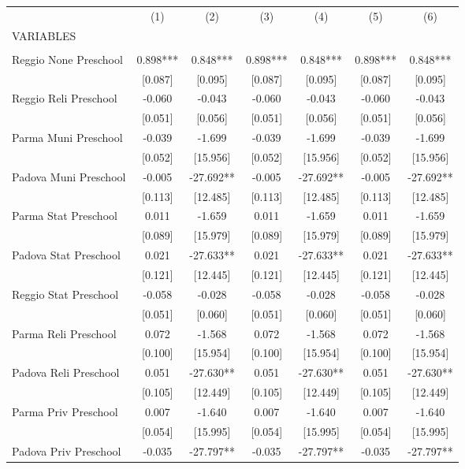 \begin{tabular}{lcccccc} \hline
 & (1) & (2) & (3) & (4) & (5) & (6) \\
VARIABLES &  &  &  &  &  &  \\ \hline
 &  &  &  &  &  &  \\
Reggio None Preschool & 0.898*** & 0.848*** & 0.898*** & 0.848*** & 0.898*** & 0.848*** \\
 & [0.087] & [0.095] & [0.087] & [0.095] & [0.087] & [0.095] \\
Reggio Reli Preschool & -0.060 & -0.043 & -0.060 & -0.043 & -0.060 & -0.043 \\
 & [0.051] & [0.056] & [0.051] & [0.056] & [0.051] & [0.056] \\
Parma Muni Preschool & -0.039 & -1.699 & -0.039 & -1.699 & -0.039 & -1.699 \\
 & [0.052] & [15.956] & [0.052] & [15.956] & [0.052] & [15.956] \\
Padova Muni Preschool & -0.005 & -27.692** & -0.005 & -27.692** & -0.005 & -27.692** \\
 & [0.113] & [12.485] & [0.113] & [12.485] & [0.113] & [12.485] \\
Parma Stat Preschool & 0.011 & -1.659 & 0.011 & -1.659 & 0.011 & -1.659 \\
 & [0.089] & [15.979] & [0.089] & [15.979] & [0.089] & [15.979] \\
Padova Stat Preschool & 0.021 & -27.633** & 0.021 & -27.633** & 0.021 & -27.633** \\
 & [0.121] & [12.445] & [0.121] & [12.445] & [0.121] & [12.445] \\
Reggio Stat Preschool & -0.058 & -0.028 & -0.058 & -0.028 & -0.058 & -0.028 \\
 & [0.051] & [0.060] & [0.051] & [0.060] & [0.051] & [0.060] \\
Parma Reli Preschool & 0.072 & -1.568 & 0.072 & -1.568 & 0.072 & -1.568 \\
 & [0.100] & [15.954] & [0.100] & [15.954] & [0.100] & [15.954] \\
Padova Reli Preschool & 0.051 & -27.630** & 0.051 & -27.630** & 0.051 & -27.630** \\
 & [0.105] & [12.449] & [0.105] & [12.449] & [0.105] & [12.449] \\
Parma Priv Preschool & 0.007 & -1.640 & 0.007 & -1.640 & 0.007 & -1.640 \\
 & [0.054] & [15.995] & [0.054] & [15.995] & [0.054] & [15.995] \\
Padova Priv Preschool & -0.035 & -27.797** & -0.035 & -27.797** & -0.035 & -27.797** \\

\end{tabular}
